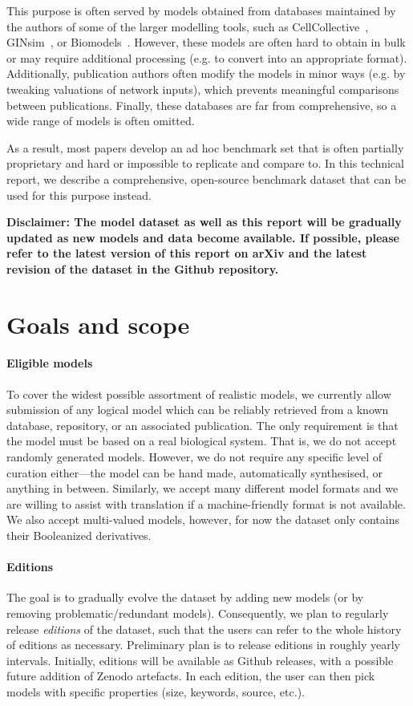 \documentclass{article}
\begin{document}
This purpose is often served by models obtained from databases maintained by the authors of some of the larger modelling tools, such as CellCollective~\cite{cell-collective}, GINsim~\cite{ginsim}, or Biomodels~\cite{biomodels}. However, these models are often hard to obtain in bulk or may require additional processing (e.g. to convert into an appropriate format). Additionally, publication authors often modify the models in minor ways (e.g. by tweaking valuations of network inputs), which prevents meaningful comparisons between publications. Finally, these databases are far from comprehensive, so a wide range of models is often omitted.

As a result, most papers develop an ad hoc benchmark set that is often partially proprietary and hard or impossible to replicate and compare to. In this technical report, we describe a comprehensive, open-source benchmark dataset that can be used for this purpose instead.

\textbf{Disclaimer: The model dataset as well as this report will be gradually updated as new models and data become available. If possible, please refer to the latest version of this report on arXiv and the latest revision of the dataset in the Github repository.}

\section{Goals and scope}

\paragraph{Eligible models} To cover the widest possible assortment of realistic models, we currently allow submission of any logical model which can be reliably retrieved from a known database, repository, or an associated publication. The only requirement is that the model must be based on a real biological system. That is, we do not accept randomly generated models. However, we do not require any specific level of curation either---the model can be hand made, automatically synthesised, or anything in between. Similarly, we accept many different model formats and we are willing to assist with translation if a machine-friendly format is not available. We also accept multi-valued models, however, for now the dataset only contains their Booleanized derivatives.

\paragraph{Editions} The goal is to gradually evolve the dataset by adding new models (or by removing problematic/redundant models). Consequently, we plan to regularly release \emph{editions} of the dataset, such that the users can refer to the whole history of editions as necessary. Preliminary plan is to release editions in roughly yearly intervals. Initially, editions will be available as Github releases, with a possible future addition of Zenodo artefacts. In each edition, the user can then pick models with specific properties (size, keywords, source, etc.).
\end{document}
